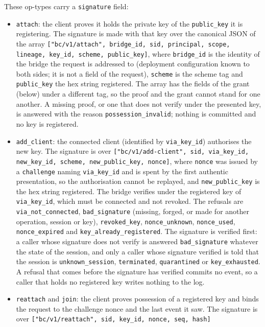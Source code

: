 These op-types carry a \texttt{signature} field:
\begin{itemize}[leftmargin=2em]
\item \texttt{attach}: the client proves it holds the private key of
the \texttt{public\_key} it is registering. The signature is made with
that key over the canonical JSON of the array
\texttt{["bc/v1/attach", bridge\_id, sid, principal, scope, lineage,
key\_id, scheme, public\_key]}, where \texttt{bridge\_id} is the identity
of the bridge the request is addressed to (deployment configuration known
to both sides; it is not a field of the request), \texttt{scheme} is the
scheme tag and \texttt{public\_key} the hex string registered. The array
has the fields of the grant (below) under a different tag, so the proof
and the grant cannot stand for one another. A missing proof, or one that
does not verify under the presented key, is answered with the reason
\texttt{possession\_invalid}; nothing is committed and no key is
registered.
\item \texttt{add\_client}: the connected client (identified by
\texttt{via\_key\_id}) authorises the new key. The signature is over
\texttt{["bc/v1/add-client", sid, via\_key\_id, new\_key\_id, scheme,
new\_public\_key, nonce]}, where \texttt{nonce} was issued by a
\texttt{challenge} naming \texttt{via\_key\_id} and is spent by the first
authentic presentation, so the authorisation cannot be replayed, and
\texttt{new\_public\_key} is the hex string registered. The bridge verifies
under the registered key of \texttt{via\_key\_id}, which must be connected
and not revoked. The refusals are \texttt{via\_not\_connected},
\texttt{bad\_signature} (missing, forged, or made for another operation,
session or key), \texttt{revoked\_key}, \texttt{nonce\_unknown},
\texttt{nonce\_used}, \texttt{nonce\_expired} and
\texttt{key\_already\_registered}. The signature is verified first: a caller
whose signature does not verify is answered \texttt{bad\_signature} whatever
the state of the session, and only a caller whose signature verified is told
that the session is \texttt{unknown\_session}, \texttt{terminated},
\texttt{quarantined} or \texttt{key\_exhausted}. A refusal that comes
before the signature has verified commits no event, so a caller that holds no
registered key writes nothing to the log.
\item \texttt{reattach} and \texttt{join}: the client proves
possession of a registered key and binds the request to the
challenge nonce and the last event it saw. The signature is over
\texttt{["bc/v1/reattach", sid, key\_id, nonce, seq, hash]}

\end{itemize}
